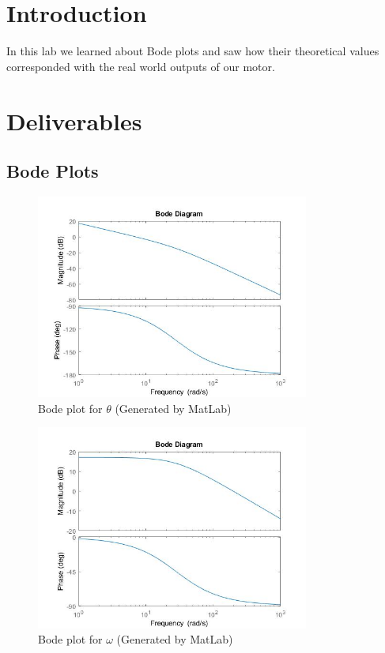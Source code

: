 
\section{Introduction}
In this lab we learned about Bode plots and saw how their theoretical values corresponded with the real world outputs of our motor. 

\section{Deliverables}
\subsection{Bode Plots}
\begin{figure}[H]
	\centering
	\includegraphics[width=0.8\textwidth]{./figures/lab2_theta.jpg}
	\caption{Bode plot for $\theta$ (Generated by MatLab)}
	\label{fig:}
\end{figure}

\begin{figure}[H]
	\centering
	\includegraphics[width=0.8\textwidth]{./figures/lab2_omega.jpg}
	\caption{Bode plot for $\omega$ (Generated by MatLab)}
	\label{fig:}
\end{figure}

